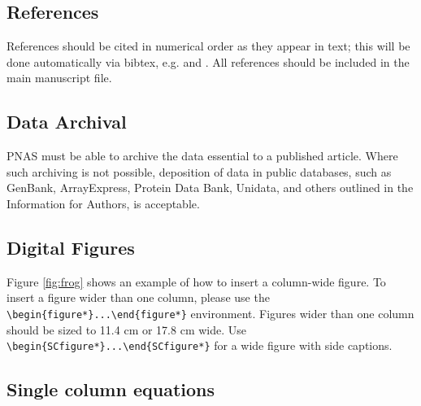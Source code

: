 \documentclass[9pt,twocolumn,twoside]{pnas-new}
\begin{document}
\subsection*{References}

References should be cited in numerical order as they appear in text; this will be done automatically via bibtex, e.g. \cite{belkin2002using} and \cite{berard1994embedding,coifman2005geometric}. All references should be included in the main manuscript file.  

\subsection*{Data Archival}

PNAS must be able to archive the data essential to a published article. Where such archiving is not possible, deposition of data in public databases, such as GenBank, ArrayExpress, Protein Data Bank, Unidata, and others outlined in the Information for Authors, is acceptable.





\subsection*{Digital Figures}
\label{sec:figures}

Figure \ref{fig:frog} shows an example of how to insert a column-wide figure. To insert a figure wider than one column, please use the \verb|\begin{figure*}...\end{figure*}| environment. Figures wider than one column should be sized to 11.4 cm or 17.8 cm wide. Use \verb|\begin{SCfigure*}...\end{SCfigure*}| for a wide figure with side captions.

\subsection*{Single column equations}
\end{document}
